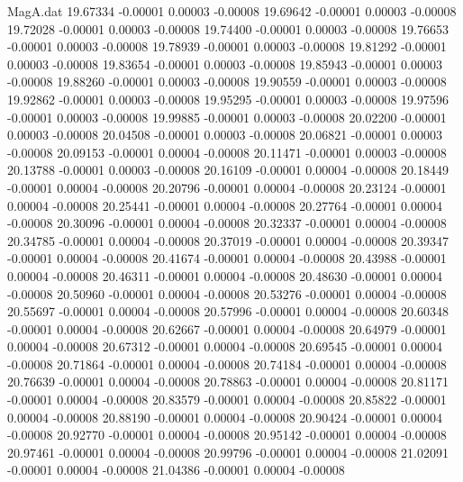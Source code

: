 \begin{filecontents}{MagA.dat}
  19.67334   -0.00001    0.00003   -0.00008
  19.69642   -0.00001    0.00003   -0.00008
  19.72028   -0.00001    0.00003   -0.00008
  19.74400   -0.00001    0.00003   -0.00008
  19.76653   -0.00001    0.00003   -0.00008
  19.78939   -0.00001    0.00003   -0.00008
  19.81292   -0.00001    0.00003   -0.00008
  19.83654   -0.00001    0.00003   -0.00008
  19.85943   -0.00001    0.00003   -0.00008
  19.88260   -0.00001    0.00003   -0.00008
  19.90559   -0.00001    0.00003   -0.00008
  19.92862   -0.00001    0.00003   -0.00008
  19.95295   -0.00001    0.00003   -0.00008
  19.97596   -0.00001    0.00003   -0.00008
  19.99885   -0.00001    0.00003   -0.00008
  20.02200   -0.00001    0.00003   -0.00008
  20.04508   -0.00001    0.00003   -0.00008
  20.06821   -0.00001    0.00003   -0.00008
  20.09153   -0.00001    0.00004   -0.00008
  20.11471   -0.00001    0.00003   -0.00008
  20.13788   -0.00001    0.00003   -0.00008
  20.16109   -0.00001    0.00004   -0.00008
  20.18449   -0.00001    0.00004   -0.00008
  20.20796   -0.00001    0.00004   -0.00008
  20.23124   -0.00001    0.00004   -0.00008
  20.25441   -0.00001    0.00004   -0.00008
  20.27764   -0.00001    0.00004   -0.00008
  20.30096   -0.00001    0.00004   -0.00008
  20.32337   -0.00001    0.00004   -0.00008
  20.34785   -0.00001    0.00004   -0.00008
  20.37019   -0.00001    0.00004   -0.00008
  20.39347   -0.00001    0.00004   -0.00008
  20.41674   -0.00001    0.00004   -0.00008
  20.43988   -0.00001    0.00004   -0.00008
  20.46311   -0.00001    0.00004   -0.00008
  20.48630   -0.00001    0.00004   -0.00008
  20.50960   -0.00001    0.00004   -0.00008
  20.53276   -0.00001    0.00004   -0.00008
  20.55697   -0.00001    0.00004   -0.00008
  20.57996   -0.00001    0.00004   -0.00008
  20.60348   -0.00001    0.00004   -0.00008
  20.62667   -0.00001    0.00004   -0.00008
  20.64979   -0.00001    0.00004   -0.00008
  20.67312   -0.00001    0.00004   -0.00008
  20.69545   -0.00001    0.00004   -0.00008
  20.71864   -0.00001    0.00004   -0.00008
  20.74184   -0.00001    0.00004   -0.00008
  20.76639   -0.00001    0.00004   -0.00008
  20.78863   -0.00001    0.00004   -0.00008
  20.81171   -0.00001    0.00004   -0.00008
  20.83579   -0.00001    0.00004   -0.00008
  20.85822   -0.00001    0.00004   -0.00008
  20.88190   -0.00001    0.00004   -0.00008
  20.90424   -0.00001    0.00004   -0.00008
  20.92770   -0.00001    0.00004   -0.00008
  20.95142   -0.00001    0.00004   -0.00008
  20.97461   -0.00001    0.00004   -0.00008
  20.99796   -0.00001    0.00004   -0.00008
  21.02091   -0.00001    0.00004   -0.00008
  21.04386   -0.00001    0.00004   -0.00008

\end{filecontents}
